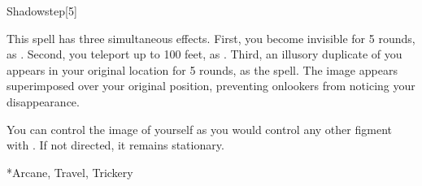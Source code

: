 \begin{spellsection}{Shadowstep}[5]
    \begin{spellheader}
    \end{spellheader}
    \begin{spellcontent}
        \begin{spelltargetinginfo}
        \end{spelltargetinginfo}
        \begin{spelleffects}
            \spelleffect This spell has three simultaneous effects.
            First, you become invisible for 5 rounds, as .
            Second, you teleport up to 100 feet, as .
            Third, an illusory duplicate of you appears in your original location for 5 rounds, as the  spell.
            The image appears superimposed over your original position, preventing onlookers from noticing your disappearance.

            You can control the image of yourself as you would control any other figment with . If not directed, it remains stationary.
        \end{spelleffects}
    \end{spellcontent}
    \begin{spellfooter}
        *{Arcane, Travel, Trickery}
        \miscastexplode
    \end{spellfooter}
    \begin{spellaugments}
    \end{spellaugments}
\end{spellsection}

